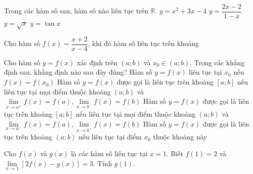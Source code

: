 \begin{ex}%
	Trong các hàm số sau, hàm số nào  liên tục trên $\mathbb{R}$.
	\choice 
		{\True  $y=x^2+3x-4$}
		{$y=\dfrac{2x-2}{1-x}$} 
		{$y=\sqrt  x$}
		{$y=\tan  x$}
\end{ex}

\begin{ex}%
	Cho hàm số $f(x)=\dfrac{x+2}{x-4}$,  khi đó hàm số liên tục trên khoảng
\end{ex}

\begin{ex}%
	Cho hàm số $y = f(x)$ xác định trên $(a; b)$ và $x_0 \in (a;b)$. Trong các khẳng định sau, khẳng  định nào sau đây đúng?
	\choice 
		{Hàm số $y = f(x)$  liên tục tại $x_0$ nếu $f(x) = f(x_0)$}
		{\True Hàm số $y = f(x)$ được gọi là liên tục trên khoảng $[a; b]$ nếu  liên tục tại mọi điểm thuộc khoảng $(a; b)$ và $\lim\limits_{{x \to a^+}} f(x) = f(a), \lim\limits_{{x \to b^-}} f(x) = f(b)$}
		{Hàm số $y = f(x)$ được gọi là liên tục trên khoảng $[a; b]$ nếu liên tục tại mọi điểm thuộc khoảng $(a; b)$  và $\lim\limits_{{x \to a^-}} f(x) = f(a), \lim\limits_{{x \to b^+}} f(x) = f(b)$}
		{Hàm số $y = f(x)$ được gọi là liên  tục trên khoảng $(a; b)$ nếu liên tục tại điểm $x_0$ thuộc khoảng này}
\end{ex}

\begin{bt}%
	Cho $f(x)$ và $g(x)$ là các hàm số liên tục tại $x=1$. Biết $f(1)=2$ và\break $\lim\limits_{x \rightarrow 1}[2 f(x)-g(x)]=3$. Tính $g(1)$.
\end{bt}

